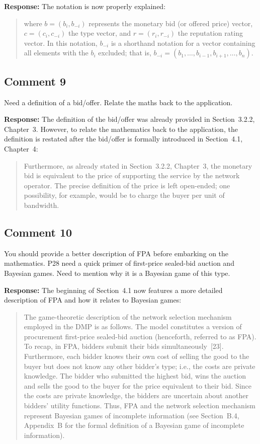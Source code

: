 \documentclass[10pt,a4paper,notitlepage]{article}
\numberwithin{equation}{section}
\begin{document}
\textbf{Response:}
The notation is now properly explained:
\begin{quote}
where $b = (b_i,b_{-i})$ represents the monetary bid (or offered price) vector, $c = (c_i, c_{-i})$ the type vector, and $r = (r_i, r_{-i})$ the reputation rating vector. In this notation, $b_{-i}$ is a shorthand notation for a vector containing all elements with the $b_i$ excluded; that is, $b_{-i} = (b_1, \ldots, b_{i-1}, b_{i+1}, \ldots, b_n)$.
\end{quote}

\subsection{Comment 9}
Need a definition of a bid/offer. Relate the maths back to the application.

\textbf{Response:}
The definition of the bid/offer was already provided in Section~3.2.2, Chapter~3. However, to relate the mathematics back to the application, the definition is restated after the bid/offer is formally introduced in Section~4.1, Chapter~4:
\begin{quote}
Furthermore, as already stated in Section~3.2.2, Chapter~3, the monetary bid is equivalent to the price of supporting the service by the network operator. The precise definition of the price is left open-ended; one possibility, for example, would be to charge the buyer per unit of bandwidth.
\end{quote}

\subsection{Comment 10}
You should provide a better description of FPA before embarking on the mathematics. P28 need a quick primer of first-price sealed-bid auction and Bayesian games. Need to mention why it is a Bayesian game of this type.

\textbf{Response:}
The beginning of Section~4.1 now features a more detailed description of FPA and how it relates to Bayesian games:
\begin{quote}
The game-theoretic description of the network selection mechanism employed in the DMP is as follows. The model constitutes a version of procurement first-price sealed-bid auction (henceforth, referred to as FPA). To recap, in FPA, bidders submit their bids simultaneously~[23]. Furthermore, each bidder knows their own cost of selling the good to the buyer but does not know any other bidder's type; i.e., the costs are private knowledge. The bidder who submitted the highest bid, wins the auction and sells the good to the buyer for the price equivalent to their bid. Since the costs are private knowledge, the bidders are uncertain about another bidders' utility functions. Thus, FPA and the network selection mechanism represent Bayesian games of incomplete information (see Section~B.4, Appendix~B for the formal definition of a Bayesian game of incomplete information).
\end{quote}
\end{document}
